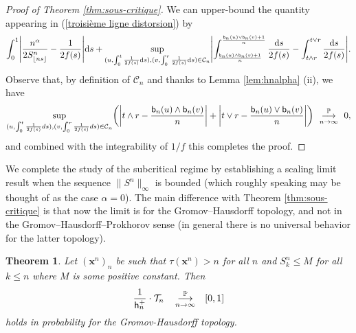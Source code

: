 \documentclass[11pt]{article}
\theoremstyle{plain}
\newtheorem{theorem}{Theorem}[section]
\theoremstyle{definition}
\theoremstyle{remark}
\renewcommand{\P}{{\mathbb{P}}} %
\newcommand{\1}{\mathbbm{1}} %
\newcommand{\proba}[1]{\mathbb{P}\left(#1\right)} %
\newcommand{\T}{\mathcal{T}} %
\newcommand{\birth}{\mathsf{b}} %
\newcommand{\h}{\mathsf{h}} %
\newcommand{\Xb}{\mathrm{\mathbf{x}}} %
\newcommand{\cvproba}[1][n]{\enskip\mathop{\longrightarrow}^{\P}_{#1 \to \infty}\enskip}
\let\originalleft\left
\let\originalright\right
\renewcommand{\left}{\mathopen{}\mathclose\bgroup\originalleft}
\renewcommand{\right}{\aftergroup\egroup\originalright}
\begin{document}
\begin{proof}[Proof of Theorem \ref{thm:sous-critique}]
We can upper-bound the quantity appearing in (\ref{troisième ligne distorsion}) by
$$
\int_0^1 \left|
\frac{n^\alpha}{2S^n_{\lfloor ns \rfloor}} - \frac{1}{2f(s)} 
\right| \mathrm{d}s +
 \sup_{(u, \int_0^t \frac{1}{2f(s)} \mathrm{d}s), (v, \int_0^r \frac{1}{2f(s)} \mathrm{d}s) \in \mathcal{C}_n}
 \left| \int_{ \frac{\birth_n(u)\wedge \birth_n(v) +1}{n}}^{ \frac{\birth_n(u) \vee \birth_n (v)+1}{n}} \frac{\mathrm{d}s}{2 f(s)}- \int_{t\wedge r}^{t\vee r} \frac{\mathrm{d}s}{2f(s)} 
\right|.
$$
Observe that, by definition of $\mathcal{C}_n$ and thanks to Lemma \ref{lem:hnalpha} (ii), we have
\[
\sup_{(u, \int_0^t \frac{1}{2f(s)} ds), (v, \int_0^r \frac{1}{2f(s)} ds) \in \mathcal{C}_n} \left( \left| t \wedge r- \frac{\birth_n(u)\wedge \birth_n(v)}{n} \right| +  \left| t \vee r- \frac{\birth_n(u)\vee \birth_n(v)}{n} \right| \right)
\cvproba[n] 0,
\]
and combined with the integrability of $1/f$ this completes the proof.
\end{proof}

We complete the study of the subcritical regime by establishing a scaling limit result when the sequence  $\| S^{n} \|_{\infty}$ is bounded (which roughly speaking may be thought of {as} the case $\alpha=0$). The main difference with Theorem \ref{thm:sous-critique} is that now the limit is for the Gromov--Hausdorff topology, and not in the Gromov--Hausdorff--Prokhorov sense (in general there is no universal behavior for the latter topology).

\begin{theorem}
\label{thm:alpha0}
Let $(\Xb^n)_n$ be such that $\tau(\Xb^n)>n$ for all $n$ and $S_k^n \leq M$ for all $k\leq n$ where $M$ is some positive constant. Then
\[
\frac{1}{\h_n^+} \cdot \T_{n}  \quad \mathop{\longrightarrow}^{\P}_{n \rightarrow \infty} \quad \left[0,1\right]
\]
holds in probability for the Gromov-Hausdorff topology.
\end{theorem}
\end{document}
